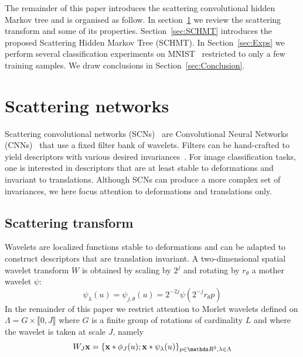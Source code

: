 \documentclass{article}
\begin{document}
  The remainder of this paper introduces the scattering convolutional hidden Markov tree and is organised as follow. In section~\ref{sec:SCN} we review the scattering transform and some of its properties. Section~\ref{sec:SCHMT} introduces the proposed Scattering Hidden Markov Tree (SCHMT). In Section~\ref{sec:Exps} we perform several classification experiments on MNIST~\cite{lecun2016web} restricted  to only a few training samples. We draw conclusions in Section~\ref{sec:Conclusion}.
  
\section{Scattering networks}
  \label{sec:SCN}
  \vspace{-5pt}
  Scattering convolutional networks (SCNs)~\cite{bruna2013scattering} are Convolutional Neural Networks (CNNs)~\cite{lecun1995convolutional} that use a fixed filter bank of wavelets. Filters can be hand-crafted to yield descriptors with various desired invariances~\cite{mallat2012gis}. For image classification tasks, one is interested in descriptors that are at least stable to deformations and invariant to translations. Although SCNs can produce a more complex set of invariances, we here focus attention to deformations and translations only.

  \vspace{-5pt}
  \subsection{Scattering transform}
    \label{subsec:SCN/ST}
    \vspace{-5pt}
    Wavelets are localized functions stable to deformations and can be adapted to construct descriptors that are translation invariant. A two-dimensional spatial wavelet transform $W$ is obtained by scaling
    by $2^{j}$ and rotating by $r_{\theta}$ a mother wavelet $\psi$:
    \vspace{-5pt}
    \begin{equation}
      \label{eq:multi-scale directional wavelet}
      \psi_{\lambda}(u) = \psi_{j,\theta}(u) = 2^{-2j} \psi(2^{-j}r_{\theta}p)
    \end{equation}
    In the remainder of this paper we restrict attention to Morlet wavelets defined on $\Lambda = G \times \llbracket 0,J \rrbracket$ where $G$ is a finite group of rotations of cardinality $L$ and where the wavelet is taken at scale $J$, namely 
    \vspace{-5pt}
    \begin{equation}
      \label{eq:wavelet transform}
      W_{J}\bfx = \{ \bfx \ast \phi_{J}(u); \bfx \ast \psi_{\lambda}(u) \}_{p\in\dsR^{2},\lambda \in \Lambda}
    \end{equation}
    \vspace{-15pt}
    
\end{document}
